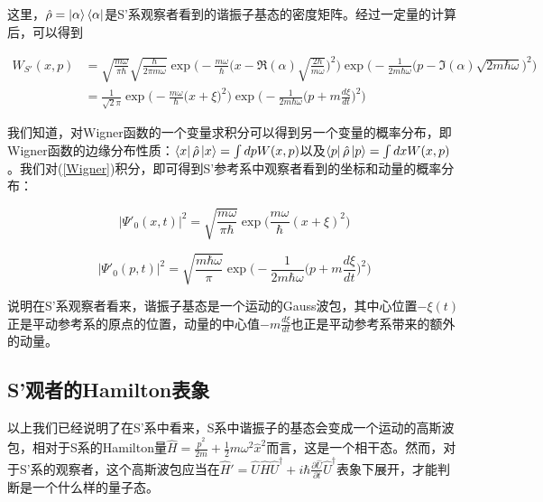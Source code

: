 \documentclass[a4paper]{article}
\begin{document}
        这里，$\hat{\rho}=\ket{\alpha}\bra{\alpha}$是S'系观察者看到的谐振子基态的密度矩阵。经过一定量的计算后，可以得到

        \begin{equation}\label{Wigner}
            \begin{split}
                W_{S'}(x, p) &= \sqrt{\frac{m\omega}{\pi\hbar}} \sqrt{\frac{\hbar}{2\pi m\omega}} \exp\biggl(-\frac{m\omega}{\hbar}\bigl(x-\Re(\alpha)\sqrt{\frac{2\hbar}{m\omega}}\bigr)^2\biggr) \exp\biggl(-\frac{1}{2m\hbar\omega}\bigl(p-\Im(\alpha)\sqrt{2m\hbar\omega}\bigr)^2\biggr) \\
                    &= \frac{1}{\sqrt{2}\pi} \exp\biggl(-\frac{m\omega}{\hbar}\bigl(x+\xi\bigr)^2\biggr) \exp\biggl(-\frac{1}{2m\hbar\omega}\bigl(p+m\frac{d\xi}{dt}\bigr)^2\biggr)
            \end{split}
        \end{equation}

        我们知道，对Wigner函数的一个变量求积分可以得到另一个变量的概率分布，即Wigner函数的边缘分布性质：$\bra{x}\hat{\rho}\ket{x}=\int dp W(x, p)$以及$\bra{p}\hat{\rho}\ket{p}=\int dx W(x, p)$。我们对(\ref{Wigner})积分，即可得到S'参考系中观察者看到的坐标和动量的概率分布：

        \begin{equation}
            |\Psi'_0(x,t)|^2 = \sqrt{\frac{m\omega}{\pi\hbar}} \exp\bigg(\frac{m\omega}{\hbar}(x+\xi)^2\bigg)
        \end{equation}

        \begin{equation}
            |\Psi'_0(p,t)|^2 = \sqrt{\frac{m\hbar\omega}{\pi}} \exp\biggl(-\frac{1}{2m\hbar\omega}\bigl(p+m\frac{d\xi}{dt}\bigr)^2\biggr)
        \end{equation}
        
        说明在S'系观察者看来，谐振子基态是一个运动的Gauss波包，其中心位置$-\xi(t)$正是平动参考系的原点的位置，动量的中心值$-m\frac{d\xi}{dt}$也正是平动参考系带来的额外的动量。



    \subsection{S'观者的Hamilton表象}

        以上我们已经说明了在S'系中看来，S系中谐振子的基态会变成一个运动的高斯波包，相对于S系的Hamilton量$\hat{H}=\frac{\hat{p}^2}{2m}+\frac{1}{2}m\omega^2\hat{x}^2$而言，这是一个相干态。然而，对于S'系的观察者，这个高斯波包应当在$\hat{H}'=\hat{U}\hat{H}\hat{U}^\dagger+i\hbar\frac{\partial\hat{U}}{\partial t}\hat{U}^\dagger$表象下展开，才能判断是一个什么样的量子态。
\end{document}
